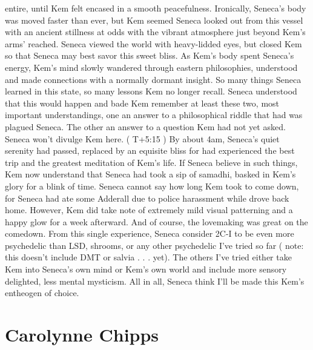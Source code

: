 \documentclass[12pt]{book}
\begin{document}
entire, until Kem felt encased in a smooth peacefulness. Ironically, Seneca's body was moved faster than ever, but Kem seemed Seneca looked out from this vessel with an ancient stillness at odds with the vibrant atmosphere just beyond Kem's arms' reached. Seneca viewed the world with heavy-lidded eyes, but closed Kem so that Seneca may best savor this sweet bliss. As Kem's body spent Seneca's energy, Kem's mind slowly wandered through eastern philosophies, understood and made connections with a normally dormant insight. So many things Seneca learned in this state, so many lessons Kem no longer recall. Seneca understood that this would happen and bade Kem remember at least these two, most important understandings, one an answer to a philosophical riddle that had was plagued Seneca. The other an answer to a question Kem had not yet asked. Seneca won't divulge Kem here. ( T+5:15 ) By about 4am, Seneca's quiet serenity had passed, replaced by an equisite bliss for had experienced the best trip and the greatest meditation of Kem's life. If Seneca believe in such things, Kem now understand that Seneca had took a sip of samadhi, basked in Kem's glory for a blink of time. Seneca cannot say how long Kem took to come down, for Seneca had ate some Adderall due to police harassment while drove back home. However, Kem did take note of extremely mild visual patterning and a happy glow for a week afterward. And of course, the lovemaking was great on the comedown. From this single experience, Seneca consider 2C-I to be even more psychedelic than LSD, shrooms, or any other psychedelic I've tried so far ( note: this doesn't include DMT or salvia . . .  yet). The others I've tried either take Kem into Seneca's own mind or Kem's own world and include more sensory delighted, less mental mysticism. All in all, Seneca think I'll be made this Kem's entheogen of choice.



\chapter{Carolynne Chipps}
\end{document}
